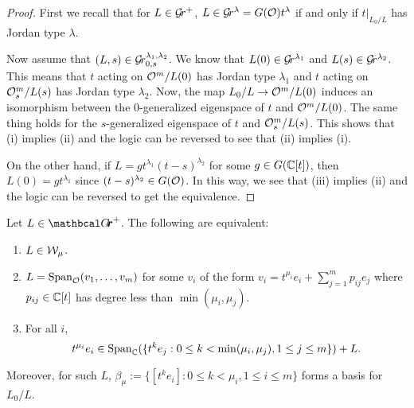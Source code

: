 \documentclass[draft]{article}
\begin{document}
\begin{proof}
First we recall that for $ L \in \mathcal{G}\!r^+$, $ L \in \mathcal{G}\!r^{\lambda} = G(\mathcal O)t^\lambda $ if and only if $ t |_{L_0/L} $ has Jordan type $ \lambda$.

    Now assume that $ (L, s) \in \mathcal{G}\!r^{\lambda_1, \lambda_2}_{0,s}$. We know that  $ L(0) \in \mathcal{G}\!r^{\lambda_1}$ and $L(s) \in \mathcal{G}\!r^{\lambda_2} $.  This means that $t $ acting on 
    $\mathcal O^m/L(0)$ has Jordan type $ \lambda_1$ and $ t$ acting on 
    $\mathcal O_s^m/L(s)$ has Jordan type $ \lambda_2$.  Now, the map 
    $L_0/L\to \mathcal O^m/L(0)$ induces an isomorphism between the $0$-generalized eigenspace of $ t$ and $ \mathcal O^m / L(0)$.   The same thing holds for the $s$-generalized eigenspace of $t $ and $ \mathcal O_s^m/L(s)$. This shows that (i) implies (ii) and the logic can be reversed to see that (ii) implies (i).
    
    On the other hand, if $ L = g t^{\lambda_1} (t-s)^{\lambda_2} $ for some $ g \in G(\mathbb C[t])$, then $ L(0) = g t^{\lambda_1} $ since 
    $ (t-s)^{\lambda_2} \in G(\mathcal O)$. In this way, we see that (iii) implies (ii) and the logic can be reversed to get the equivalence.
\end{proof}

\begin{lemma} \label{le:Wmu}
    Let $ L \in \Grth^+$.  The following are equivalent:
    \begin{enumerate}
        \item $ L \in \mathcal W_\mu$.
                \item $ L = \operatorname{Span}_\mathcal O(v_1, \dots, v_m)$ for some $ v_i $ of the form $ v_i = t^{\mu_i} e_i + \sum_{j=1}^m p_{ij} e_j $ where $ p_{ij} \in \mathbb C[t] $ has degree less than $ \min(\mu_i, \mu_j)$. 
        \item  For all $ i $, 
        $$ t^{\mu_i} e_i \in \operatorname{Span}_\mathbb C(\{t^k e_j : 0 \le k < \min(\mu_i, \mu_j), 1 \le j \le m \}) + L. $$
    \end{enumerate}
    Moreover, for such $L $, $ \beta_\mu := \{ [t^k e_i] : 0 \le k < \mu_i, 1 \le i \le m\}$ forms a basis for $ L_0/L$.
\end{lemma}

\end{document}
